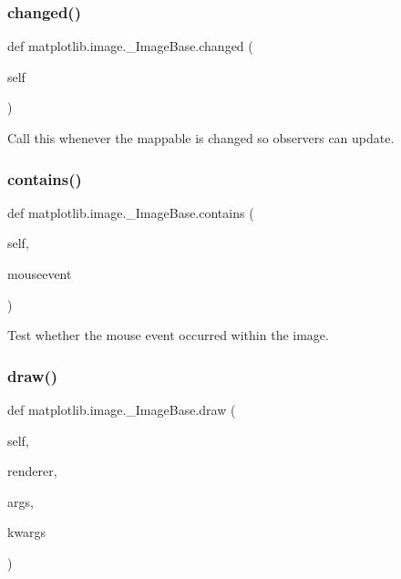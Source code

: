 \subsubsection{\texorpdfstring{changed()}{changed()}}
{\footnotesize\ttfamily def matplotlib.\+image.\+\_\+\+Image\+Base.\+changed (\begin{DoxyParamCaption}\item[{}]{self }\end{DoxyParamCaption})}

\begin{DoxyVerb}Call this whenever the mappable is changed so observers can update.
\end{DoxyVerb}
 \mbox{\label{classmatplotlib_1_1image_1_1__ImageBase_a34173e76d12b5ecd5835f328436bc461}} 
\subsubsection{\texorpdfstring{contains()}{contains()}}
{\footnotesize\ttfamily def matplotlib.\+image.\+\_\+\+Image\+Base.\+contains (\begin{DoxyParamCaption}\item[{}]{self,  }\item[{}]{mouseevent }\end{DoxyParamCaption})}

\begin{DoxyVerb}Test whether the mouse event occurred within the image.\end{DoxyVerb}
 \mbox{\label{classmatplotlib_1_1image_1_1__ImageBase_aa4af506a938c83cdb74986f9df93611d}} 
\subsubsection{\texorpdfstring{draw()}{draw()}}
{\footnotesize\ttfamily def matplotlib.\+image.\+\_\+\+Image\+Base.\+draw (\begin{DoxyParamCaption}\item[{}]{self,  }\item[{}]{renderer,  }\item[{}]{args,  }\item[{}]{kwargs }\end{DoxyParamCaption})}

